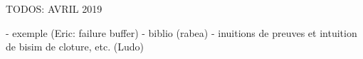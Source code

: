 \documentclass{lmcs}
\newcommand{\TODO}[1]{\textcolor{red}{\textbf{[TODO:#1]}}}
\begin{document}
TODOS: AVRIL 2019

- exemple (Eric: failure buffer)
- biblio (rabea)
- inuitions de preuves et intuition de bisim de cloture, etc. (Ludo)























\end{document}
